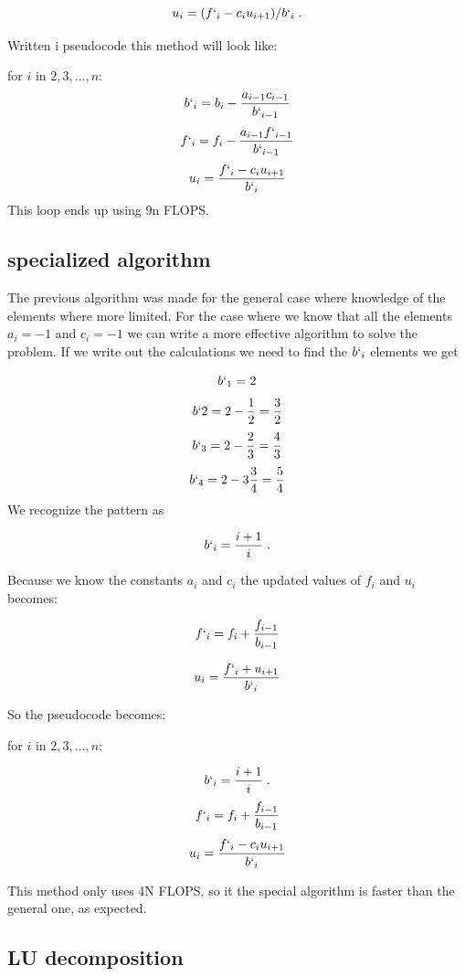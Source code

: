 \documentclass[english,a4paper, 11pt]{article}
\begin{document}
\begin{equation}
u_i = (f`_i - c_iu_{i+1})/b`_i\;.
\label{Backward}
\end{equation} 

Written i pseudocode this method will look like:

for $i$ in $2,3, ..., n$:
$$
	b`_i = b_i - \frac{a_{i-1}c_{i-1}}{b`_{i-1}}
$$
$$
	f`_i = f_i - \frac{a_{i-1}f`_{i-1}}{b`_{i-1}}
$$
$$
	u_i = \frac{f`_i - c_iu_{i+1}}{b`_i}
$$
This loop ends up using 9n FLOPS.

\subsection{specialized algorithm}

The previous algorithm was made for the general case where knowledge of the elements where more limited. For the case where we know that all the elements $a_i = -1$ and $c_i = -1$ we can write a more effective algorithm to solve the problem. If we write out the calculations we need to find the $b`_i$ elements we get

$$
b`_1 = 2
$$
$$
b`2 = 2-\frac{1}{2} = \frac{3}{2}
$$
$$
b`_3 = 2 - \frac{2}{3} = \frac{4}{3}
$$
$$
b`_4 =  2- 3\frac{3}{4} = \frac{5}{4}
$$
We recognize the pattern as

\begin{equation}
b`_i = \frac{i+1}{i}\;.
\label{Specialb}
\end{equation}

Because we know the constants $a_i$ and $c_i$ the updated values of $f_i$ and $u_i$ becomes:

\begin{equation}
f`_i = f_i + \frac{f_{i-1}}{b_{i-1}}
\label{Specialf}
\end{equation}

\begin{equation}
u_i = \frac{f`_i + u_{i+1}}{b`_i}
\label{Specialu}
\end{equation}

So the pseudocode becomes:

for $i$ in $2,3, ..., n$:

$$
b`_i = \frac{i+1}{i}\;.
$$
$$
f`_i = f_i + \frac{f_{i-1}}{b_{i-1}}
$$
$$
u_i = \frac{f`_i -c_iu_{i+1}}{b`_i}
$$

This method only uses 4N FLOPS, so it the special algorithm is faster than the general one, as expected. 

\subsection{LU decomposition}
\end{document}
